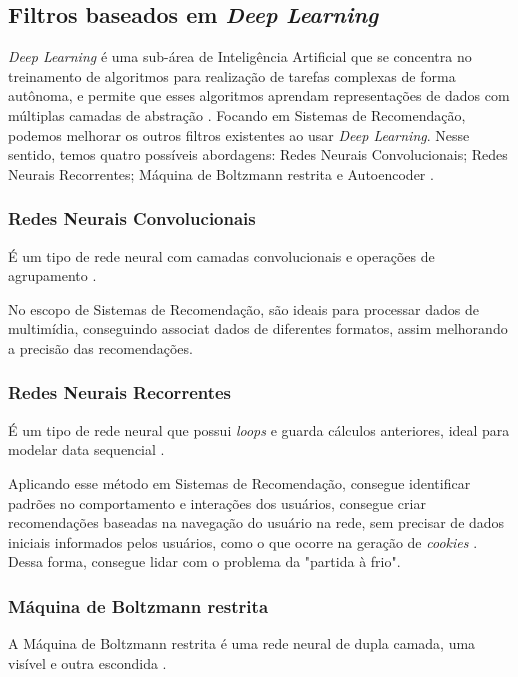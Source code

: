 \subsection{Filtros baseados em \textit{Deep Learning}}\label{subsec:filtrodeep}
\textit{Deep Learning} é uma sub-área de Inteligência Artificial que se concentra no treinamento de algoritmos para 
realização de tarefas complexas de forma autônoma, e permite que esses algoritmos aprendam representações de 
dados com múltiplas camadas de abstração \cite{LeCun2015}. Focando em Sistemas de Recomendação, 
podemos melhorar os outros filtros existentes ao usar \textit{Deep Learning}. Nesse sentido, temos quatro possíveis 
abordagens: Redes Neurais Convolucionais; Redes Neurais Recorrentes; Máquina de Boltzmann restrita e Autoencoder 
\cite{elSisi2020}.

\subsubsection{Redes Neurais Convolucionais}\label{subsubsec:rnc}
É um tipo de rede neural com camadas convolucionais e operações de agrupamento \cite{elSisi2020}.

No escopo de Sistemas de Recomendação, são ideais para processar dados de multimídia, conseguindo associat dados de 
diferentes formatos, assim melhorando a precisão das recomendações.

\subsubsection{Redes Neurais Recorrentes}\label{subsubsec:rnr}
É um tipo de rede neural que possui \textit{loops} e guarda cálculos anteriores, ideal para modelar data sequencial 
\cite{elSisi2020}.

Aplicando esse método em Sistemas de Recomendação, consegue identificar padrões no comportamento e interações dos usuários,
consegue criar recomendações baseadas na navegação do usuário na rede, sem precisar de dados iniciais informados pelos
usuários, como o que ocorre na geração de \textit{cookies} \cite{elSisi2020}. Dessa forma, consegue lidar com o problema 
da "partida à frio".

\subsubsection{Máquina de Boltzmann restrita}\label{subsubsec:boltzmann}
A Máquina de Boltzmann restrita é uma rede neural de dupla camada, uma visível e outra escondida \cite{elSisi2020}. 

